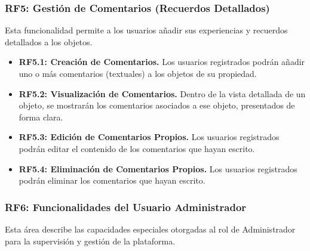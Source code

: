 \subsubsection{RF5: Gestión de Comentarios (Recuerdos Detallados)}
\label{rf:gestionComentarios}
Esta funcionalidad permite a los usuarios añadir sus experiencias y recuerdos detallados a los objetos.

\begin{itemize}
    \item \textbf{RF5.1: Creación de Comentarios.} Los usuarios registrados podrán añadir uno o más comentarios (textuales) a los objetos de su propiedad.
    \item \textbf{RF5.2: Visualización de Comentarios.} Dentro de la vista detallada de un objeto, se mostrarán los comentarios asociados a ese objeto, presentados de forma clara.
    \item \textbf{RF5.3: Edición de Comentarios Propios.} Los usuarios registrados podrán editar el contenido de los comentarios que hayan escrito.
    \item \textbf{RF5.4: Eliminación de Comentarios Propios.} Los usuarios registrados podrán eliminar los comentarios que hayan escrito.
\end{itemize}

\subsubsection{RF6: Funcionalidades del Usuario Administrador}
\label{rf:adminFuncionalidades}
Esta área describe las capacidades especiales otorgadas al rol de Administrador para la supervisión y gestión de la plataforma.

